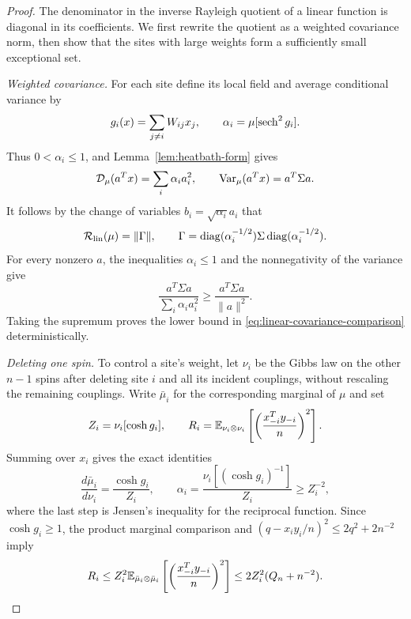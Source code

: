 \begin{proof}
The denominator in the inverse Rayleigh quotient of a linear function
is diagonal in its coefficients. We first rewrite the quotient as a
weighted covariance norm, then show that the sites with large weights
form a sufficiently small exceptional set.

\smallskip\noindent\emph{Weighted covariance.}
For each site define its local field and average conditional variance by
\[
 g_i(x)=\sum_{j\ne i}W_{ij}x_j,
 \qquad \alpha_i=\mu[\operatorname{sech}^2g_i].
\]
Thus $0<\alpha_i\le1$, and Lemma~\ref{lem:heatbath-form} gives
\[
 \mathcal D_\mu(a^Tx)=\sum_i\alpha_i a_i^2,
 \qquad \operatorname{Var}_\mu(a^Tx)=a^T\Sigma a.
\]
It follows by the change of variables $b_i=\sqrt{\alpha_i}a_i$ that
\begin{equation}\label{eq:weighted-covariance}
 \mathcal R_{\mathrm{lin}}(\mu)=\|\Gamma\|,
 \qquad
 \Gamma=\operatorname{diag}(\alpha_i^{-1/2})\Sigma\operatorname{diag}(\alpha_i^{-1/2}).
\end{equation}
For every nonzero $a$, the inequalities $\alpha_i\le1$ and the
nonnegativity of the variance give
\[
 \frac{a^T\Sigma a}{\sum_i\alpha_i a_i^2}
 \ge \frac{a^T\Sigma a}{\|a\|^2}.
\]
Taking the supremum proves the lower bound in
\eqref{eq:linear-covariance-comparison} deterministically.

\smallskip\noindent\emph{Deleting one spin.}
To control a site's weight, let $\nu_i$ be the Gibbs law on the other
$n-1$ spins after deleting
site $i$ and all its incident couplings, without rescaling the remaining
couplings.  Write $\bar\mu_i$ for the corresponding marginal of $\mu$ and
set
\[
 Z_i=\nu_i[\cosh g_i],\qquad
 R_i=\mathbb E_{\nu_i\otimes\nu_i}
       \left[\left(\frac{x_{-i}^Ty_{-i}}{n}\right)^2\right].
\]
Summing over $x_i$ gives the exact identities
\[
 \frac{d\bar\mu_i}{d\nu_i}=\frac{\cosh g_i}{Z_i},
 \qquad
 \alpha_i=\frac{\nu_i[(\cosh g_i)^{-1}]}{Z_i}
 \ge Z_i^{-2},
\]
where the last step is Jensen's inequality for the reciprocal function.
Since $\cosh g_i\ge1$, the product marginal comparison and
$(q-x_iy_i/n)^2\le2q^2+2n^{-2}$ imply
\begin{equation}\label{eq:cavity-overlap}
 R_i\le Z_i^2\mathbb E_{\bar\mu_i\otimes\bar\mu_i}
           \left[\left(\frac{x_{-i}^Ty_{-i}}n\right)^2\right]
 \le2Z_i^2(Q_n+n^{-2}).
\end{equation}


\end{proof}
